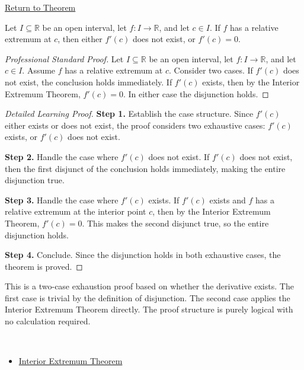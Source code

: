 \newpage
{}
\label{prf:relative-extremum-derivatives-equal-0-or-dont-exist}

\begin{remark*}[Return]
\hyperref[cor:necessary-condition-extremum]{Return to Theorem}
\end{remark*}

\begin{corollary*}
Let $I \subseteq \mathbb{R}$ be an open interval, let $f : I \to \mathbb{R}$, and let $c \in I$. If $f$ has a relative extremum at $c$, then either $f'(c)$ does not exist, or $f'(c) = 0$.
\end{corollary*}

\begin{proof}[Professional Standard Proof]
\LRAProofBodyStart
Let $I \subseteq \mathbb{R}$ be an open interval, let $f : I \to \mathbb{R}$, and let $c \in I$. Assume $f$ has a relative extremum at $c$. Consider two cases. If $f'(c)$ does not exist, the conclusion holds immediately. If $f'(c)$ exists, then by the Interior Extremum Theorem, $f'(c) = 0$. In either case the disjunction holds.
\end{proof}

\begin{proof}[Detailed Learning Proof]
\LRAProofBodyStart

\textbf{Step 1.} Establish the case structure. Since $f'(c)$ either exists or does not exist, the proof considers two exhaustive cases: $f'(c)$ exists, or $f'(c)$ does not exist.

\textbf{Step 2.} Handle the case where $f'(c)$ does not exist. If $f'(c)$ does not exist, then the first disjunct of the conclusion holds immediately, making the entire disjunction true.

\textbf{Step 3.} Handle the case where $f'(c)$ exists. If $f'(c)$ exists and $f$ has a relative extremum at the interior point $c$, then by the Interior Extremum Theorem, $f'(c) = 0$. This makes the second disjunct true, so the entire disjunction holds.

\textbf{Step 4.} Conclude. Since the disjunction holds in both exhaustive cases, the theorem is proved.
\end{proof}

\begin{remark*}
This is a two-case exhaustion proof based on whether the derivative exists. The first case is trivial by the definition of disjunction. The second case applies the Interior Extremum Theorem directly. The proof structure is purely logical with no calculation required.
\end{remark*}

\begin{remark*}[Dependencies]~\\
\begin{itemize}
  \item \hyperref[thm:interior-extremum-theorem]{Interior Extremum Theorem}
\end{itemize}
\end{remark*}

\clearpage

